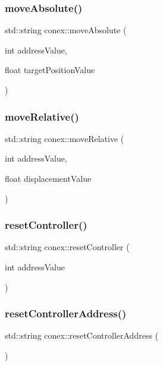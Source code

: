 \subsubsection{\texorpdfstring{move\+Absolute()}{moveAbsolute()}}
{\footnotesize\ttfamily std\+::string conex\+::move\+Absolute (\begin{DoxyParamCaption}\item[{int}]{address\+Value,  }\item[{float}]{target\+Position\+Value }\end{DoxyParamCaption})}

\mbox{\label{namespaceconex_a6728914e77941e2fb4483b6721785ffb}} 
\subsubsection{\texorpdfstring{move\+Relative()}{moveRelative()}}
{\footnotesize\ttfamily std\+::string conex\+::move\+Relative (\begin{DoxyParamCaption}\item[{int}]{address\+Value,  }\item[{float}]{displacement\+Value }\end{DoxyParamCaption})}

\mbox{\label{namespaceconex_ac817039b6d386eae2ff9b288bee8c8f6}} 
\subsubsection{\texorpdfstring{reset\+Controller()}{resetController()}}
{\footnotesize\ttfamily std\+::string conex\+::reset\+Controller (\begin{DoxyParamCaption}\item[{int}]{address\+Value }\end{DoxyParamCaption})}

\mbox{\label{namespaceconex_a4dd4ee5bd3729fc3cbf6e6f70f141baf}} 
\subsubsection{\texorpdfstring{reset\+Controller\+Address()}{resetControllerAddress()}}
{\footnotesize\ttfamily std\+::string conex\+::reset\+Controller\+Address (\begin{DoxyParamCaption}{ }\end{DoxyParamCaption})}

